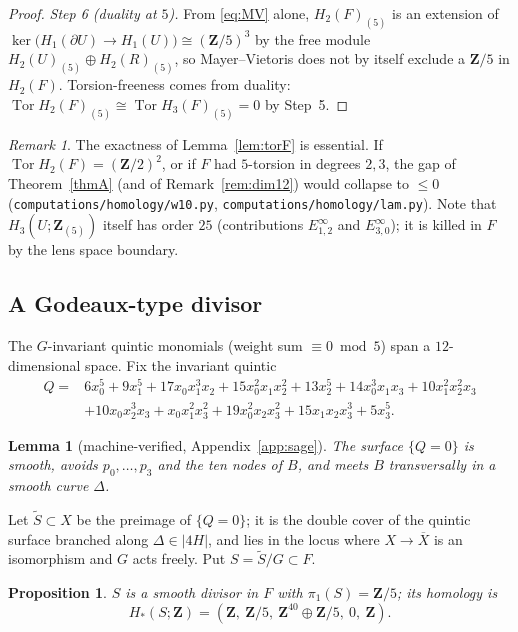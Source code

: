 \documentclass[11pt]{amsart}
\numberwithin{equation}{section}
\newtheorem{lemma}[theorem]{Lemma}
\newtheorem{proposition}[theorem]{Proposition}
\theoremstyle{definition}
\theoremstyle{remark}
\newtheorem{remark}[theorem]{Remark}
\newcommand{\Z}{\mathbf Z}
\DeclareMathOperator{\Tor}{Tor}
\begin{document}
\begin{proof}
\emph{Step 6 (duality at $5$).} From \eqref{eq:MV} alone, $H_2(F)_{(5)}$
is an extension of $\ker\bigl(H_1(\partial U)\to H_1(U)\bigr)\cong(\Z/5)^3$
by the free module $H_2(U)_{(5)}\oplus H_2(R)_{(5)}$, so Mayer--Vietoris
does not by itself exclude a $\Z/5$ in $H_2(F)$. Torsion-freeness comes
from duality: $\Tor H_2(F)_{(5)}\cong\Tor H_3(F)_{(5)}=0$ by Step~5.
\end{proof}

\begin{remark}\label{rem:5torsion}
The exactness of Lemma~\ref{lem:torF} is essential. If
$\Tor H_2(F)=(\Z/2)^2$, or if $F$ had $5$-torsion in degrees $2,3$, the
gap of Theorem~\ref{thmA} (and of Remark~\ref{rem:dim12}) would collapse
to $\le0$ (\nolinkurl{computations/homology/w10.py},
\nolinkurl{computations/homology/lam.py}). Note that $H_3(U;\Z_{(5)})$ itself
has order $25$ (contributions $E^\infty_{1,2}$ and $E^\infty_{3,0}$); it is
killed in $F$ by the lens space boundary.
\end{remark}

\subsection{A Godeaux-type divisor}\label{subsec:S}

The $G$-invariant quintic monomials (weight sum $\equiv0\bmod5$) span a
$12$-dimensional space. Fix the invariant quintic
\[
\begin{aligned}
  Q={}&6x_0^5+9x_1^5+17x_0x_1^3x_2+15x_0^2x_1x_2^2+13x_2^5+14x_0^3x_1x_3
  +10x_1^2x_2^2x_3\\
  &+10x_0x_2^3x_3+x_0x_1^2x_3^2+19x_0^2x_2x_3^2+15x_1x_2x_3^3+5x_3^5 .
\end{aligned}
\]

\begin{lemma}[machine-verified, Appendix~\ref{app:sage}]\label{lem:quintic}
The surface $\{Q=0\}$ is smooth, avoids $p_0,\dots,p_3$ and the ten nodes
of $B$, and meets $B$ transversally in a smooth curve $\Delta$.
\end{lemma}

Let $\widetilde S\subset X$ be the preimage of $\{Q=0\}$; it is the double
cover of the quintic surface branched along $\Delta\in|4H|$, and lies in the
locus where $X\to\overline X$ is an isomorphism and $G$ acts freely. Put
$S=\widetilde S/G\subset F$.

\begin{proposition}\label{prop:S}
$S$ is a smooth divisor in $F$ with $\pi_1(S)=\Z/5$; its homology is
\[
  H_*(S;\Z)=(\Z,\ \Z/5,\ \Z^{40}\oplus\Z/5,\ 0,\ \Z).
\]
\end{proposition}
\end{document}
